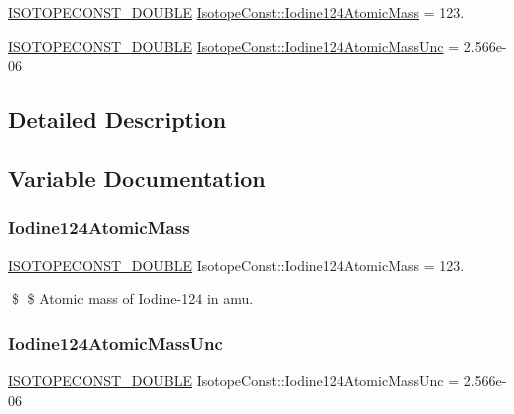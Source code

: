 \begin{DoxyCompactItemize}
\item 
\mbox{\hyperlink{group___isotope_const-_macros_ga8f45a7272ce02c0b4c65c44636ed719a}{I\+S\+O\+T\+O\+P\+E\+C\+O\+N\+S\+T\+\_\+\+D\+O\+U\+B\+LE}} \mbox{\hyperlink{group___isotope_const-_iodine-_i124_ga36764566414252fd5814cc077e51089e}{Isotope\+Const\+::\+Iodine124\+Atomic\+Mass}} = 123.
\item 
\mbox{\hyperlink{group___isotope_const-_macros_ga8f45a7272ce02c0b4c65c44636ed719a}{I\+S\+O\+T\+O\+P\+E\+C\+O\+N\+S\+T\+\_\+\+D\+O\+U\+B\+LE}} \mbox{\hyperlink{group___isotope_const-_iodine-_i124_gaeecc26aeee9e35282acffa53b4da532a}{Isotope\+Const\+::\+Iodine124\+Atomic\+Mass\+Unc}} = 2.\+566e-\/06
\end{DoxyCompactItemize}


\subsection{Detailed Description}


\subsection{Variable Documentation}
\mbox{\label{group___isotope_const-_iodine-_i124_ga36764566414252fd5814cc077e51089e}} 
\subsubsection{\texorpdfstring{Iodine124\+Atomic\+Mass}{Iodine124AtomicMass}}
{\footnotesize\ttfamily \mbox{\hyperlink{group___isotope_const-_macros_ga8f45a7272ce02c0b4c65c44636ed719a}{I\+S\+O\+T\+O\+P\+E\+C\+O\+N\+S\+T\+\_\+\+D\+O\+U\+B\+LE}} Isotope\+Const\+::\+Iodine124\+Atomic\+Mass = 123.}

\$ \$ Atomic mass of Iodine-\/124 in amu. \mbox{\label{group___isotope_const-_iodine-_i124_gaeecc26aeee9e35282acffa53b4da532a}} 
\subsubsection{\texorpdfstring{Iodine124\+Atomic\+Mass\+Unc}{Iodine124AtomicMassUnc}}
{\footnotesize\ttfamily \mbox{\hyperlink{group___isotope_const-_macros_ga8f45a7272ce02c0b4c65c44636ed719a}{I\+S\+O\+T\+O\+P\+E\+C\+O\+N\+S\+T\+\_\+\+D\+O\+U\+B\+LE}} Isotope\+Const\+::\+Iodine124\+Atomic\+Mass\+Unc = 2.\+566e-\/06}


